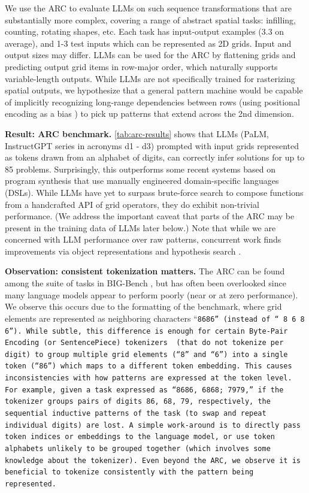 We use the ARC \cite{chollet2019measure}  to evaluate LLMs on such sequence transformations that are substantially more complex, covering a range of abstract spatial tasks: infilling, counting, rotating shapes, etc. Each task has input-output examples (3.3 on average), and 1-3 test inputs which can be represented as 2D grids. Input and output sizes may differ. LLMs can be used for the ARC by flattening grids and predicting output grid items in row-major order, which naturally supports variable-length outputs. While LLMs are not specifically trained for rasterizing spatial outputs, we hypothesize that a general pattern machine would be capable of implicitly recognizing long-range dependencies between rows (using positional encoding as a bias \cite{su2021roformer}) to pick up patterns that extend across the 2nd dimension. %

\textbf{Result: ARC benchmark.} \cref{tab:arc-results} shows that LLMs (PaLM, InstructGPT series in acronyms d1 - d3) prompted with input grids represented as tokens drawn from an alphabet of digits, can correctly infer solutions for up to 85 problems. Surprisingly, this outperforms some recent systems \cite{ferre2021first,xu2022graphs} based on program synthesis that use manually engineered domain-specific languages (DSLs).
While LLMs have yet to surpass brute-force search \cite{ainooson2023approach} to compose functions from a handcrafted API of grid operators, they do exhibit non-trivial performance. (We address the important caveat that parts of the ARC may be present in the training data of LLMs later below.) Note that while we are concerned with LLM performance over raw patterns, concurrent work finds  improvements via object representations \cite{xu2023llms} and hypothesis search \cite{wang2023hypothesis}.

\textbf{Observation: consistent tokenization matters.} The ARC can be found among the suite of tasks in BIG-Bench \cite{srivastava2022beyond}, but has often been overlooked since many language models appear to perform poorly (near or at zero performance). We observe this occurs due to the formatting of the benchmark, where grid elements are represented as neighboring characters \ie ``\tt{8686}'' (instead of ``\tt{ 8 6 8 6}''). While subtle, this difference is enough for certain Byte-Pair Encoding (or SentencePiece) tokenizers \cite{sennrich2015neural,kudo2018sentencepiece} (that do not tokenize per digit) to group  multiple grid elements (``\tt{8}'' and ``\tt{6}'') into a single token (``\tt{86}'') which maps to a different token embedding. This causes inconsistencies with how patterns are expressed at the token level. For example, given a task expressed as ``\tt{8686, 6868; 7979,}'' if the tokenizer groups pairs of digits \tt{86}, \tt{68}, \tt{79}, respectively, the sequential inductive patterns of the task (to swap and repeat individual digits) are lost. A simple work-around is to directly pass token indices or embeddings to the language model, or use token alphabets unlikely to be grouped together (which involves some knowledge about the tokenizer). Even beyond the ARC, we observe it is beneficial to tokenize  consistently with the pattern being represented. 

